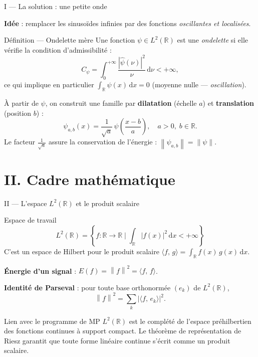 \documentclass[10pt]{beamer}
\newcommand{\scalaire}[2]{\langle #1,\, #2 \rangle}
\newcommand{\norme}[1]{\left\| #1 \right\|}
\newcommand{\RR}{\mathbb{R}}
\renewcommand{\d}{\,\mathrm{d}}
\begin{document}
	\begin{frame}{I — La solution : une \og petite onde \fg}
		
		\textbf{Idée} : remplacer les sinusoïdes infinies par des fonctions
		\emph{oscillantes et localisées}.
		
		\medskip
		\begin{block}{Définition — Ondelette mère}
			Une fonction $\psi \in L^2(\RR)$ est une \emph{ondelette} si elle vérifie
			la condition d'admissibilité :
			\[
			C_\psi = \int_0^{+\infty} \frac{|\hat{\psi}(\nu)|^2}{\nu} \d\nu < +\infty,
			\]
			ce qui implique en particulier $\displaystyle\int_{\RR} \psi(x)\d x = 0$
			(moyenne nulle --- \emph{oscillation}).
		\end{block}
		
		\medskip
		À partir de $\psi$, on construit une famille par \textbf{dilatation} (échelle $a$)
		et \textbf{translation} (position $b$) :
		\[
		\psi_{a,b}(x) = \frac{1}{\sqrt{a}}\,\psi\!\left(\frac{x - b}{a}\right),
		\quad a > 0,\; b \in \RR.
		\]
		Le facteur $\tfrac{1}{\sqrt{a}}$ assure la conservation de l'énergie :
		$\norme{\psi_{a,b}} = \norme{\psi}$.
		
	\end{frame}
	
	\section{II. Cadre mathématique}
	
	\begin{frame}{II — L'espace $L^2(\RR)$ et le produit scalaire}
		
		\begin{block}{Espace de travail}
			\[
			L^2(\RR) = \left\{ f : \RR \to \RR \;\Big|\; \int_\RR |f(x)|^2 \d x < +\infty \right\}
			\]
			C'est un espace de Hilbert pour le produit scalaire
			$\scalaire{f}{g} = \displaystyle\int_\RR f(x)\, g(x) \d x$.
		\end{block}
		
		\medskip
		\textbf{Énergie d'un signal} : $E(f) = \norme{f}^2 = \scalaire{f}{f}$.
		
		\medskip
		\textbf{Identité de Parseval} : pour toute base orthonormée $(e_k)$ de $L^2(\RR)$,
		\[
		\norme{f}^2 = \sum_k |\scalaire{f}{e_k}|^2.
		\]
		
		\medskip
		\begin{alertblock}{Lien avec le programme de MP}
			$L^2(\RR)$ est le complété de l'espace préhilbertien des fonctions continues
			à support compact. Le théorème de représentation de Riesz garantit que toute
			forme linéaire continue s'écrit comme un produit scalaire.
		\end{alertblock}
		
	\end{frame}
	
\end{document}
